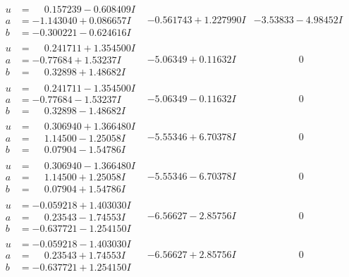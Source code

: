 \documentclass[1p]{elsarticle_modified}
\theoremstyle{definition}
\begin{document}
$$\begin{array}{c|c|c}
\begin{aligned}
u &= \phantom{-}0.157239 - 0.608409 I \\
a &= -1.143040 + 0.086657 I \\
b &= -0.300221 - 0.624616 I\end{aligned}
 & -0.561743 + 1.227990 I & -3.53833 - 4.98452 I \\ \hline\begin{aligned}
u &= \phantom{-}0.241711 + 1.354500 I \\
a &= -0.77684 + 1.53237 I \\
b &= \phantom{-}0.32898 + 1.48682 I\end{aligned}
 & -5.06349 + 0.11632 I & \phantom{-0.000000 } 0 \\ \hline\begin{aligned}
u &= \phantom{-}0.241711 - 1.354500 I \\
a &= -0.77684 - 1.53237 I \\
b &= \phantom{-}0.32898 - 1.48682 I\end{aligned}
 & -5.06349 - 0.11632 I & \phantom{-0.000000 } 0 \\ \hline\begin{aligned}
u &= \phantom{-}0.306940 + 1.366480 I \\
a &= \phantom{-}1.14500 - 1.25058 I \\
b &= \phantom{-}0.07904 - 1.54786 I\end{aligned}
 & -5.55346 + 6.70378 I & \phantom{-0.000000 } 0 \\ \hline\begin{aligned}
u &= \phantom{-}0.306940 - 1.366480 I \\
a &= \phantom{-}1.14500 + 1.25058 I \\
b &= \phantom{-}0.07904 + 1.54786 I\end{aligned}
 & -5.55346 - 6.70378 I & \phantom{-0.000000 } 0 \\ \hline\begin{aligned}
u &= -0.059218 + 1.403030 I \\
a &= \phantom{-}0.23543 - 1.74553 I \\
b &= -0.637721 - 1.254150 I\end{aligned}
 & -6.56627 - 2.85756 I & \phantom{-0.000000 } 0 \\ \hline\begin{aligned}
u &= -0.059218 - 1.403030 I \\
a &= \phantom{-}0.23543 + 1.74553 I \\
b &= -0.637721 + 1.254150 I\end{aligned}
 & -6.56627 + 2.85756 I & \phantom{-0.000000 } 0 \\ \hline\begin{aligned}

\end{aligned}
\end{array}$$
\end{document}
